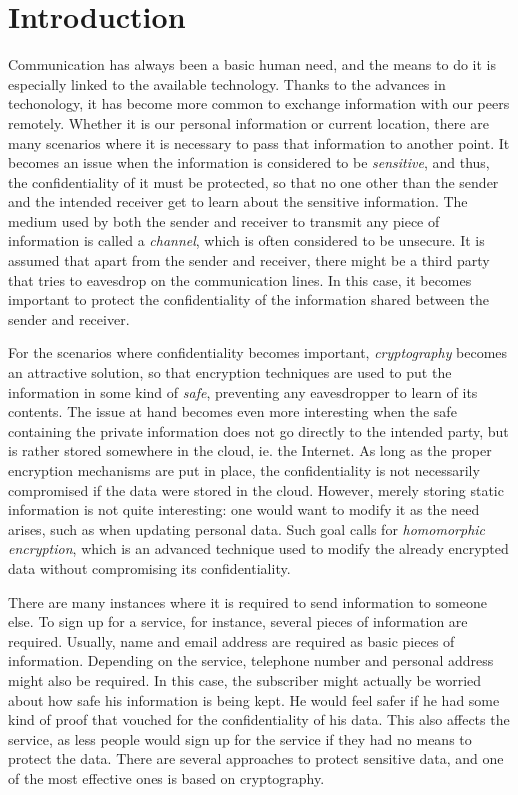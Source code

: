 \chapter{Introduction}
\label{intro}

Communication has always been a basic human need, and the means to do it is especially linked to the available technology. Thanks to the advances in techonology, it has become more common to exchange information with our peers remotely. Whether it is our personal information or current location, there are many scenarios where it is necessary to pass that information to another point. It becomes an issue when the information is considered to be \emph{sensitive}, and thus, the confidentiality of it must be protected, so that no one other than the sender and the intended receiver get to learn about the sensitive information. The medium used by both the sender and receiver to transmit any piece of information is called a \emph{channel}, which is often considered to be unsecure. It is assumed that apart from the sender and receiver, there might be a third party that tries to eavesdrop on the communication lines. In this case, it becomes important to protect the confidentiality of the information shared between the sender and receiver. 

For the scenarios where confidentiality becomes important, \emph{cryptography} becomes an attractive solution, so that encryption techniques are used to put the information in some kind of \emph{safe}, preventing any eavesdropper to learn of its contents. The issue at hand becomes even more interesting when the safe containing the private information does not go directly to the intended party, but is rather stored somewhere in the cloud, ie. the Internet. As long as the proper encryption mechanisms are put in place, the confidentiality is not necessarily compromised if the data were stored in the cloud. However, merely storing static information is not quite interesting: one would want to modify it as the need arises, such as when updating personal data. Such goal calls for \emph{homomorphic encryption}, which is an advanced technique used to modify the already encrypted data without compromising its confidentiality.

There are many instances where it is required to send information to someone else. To sign up for a service, for instance, several pieces of information are required. Usually, name and email address are required as basic pieces of information. Depending on the service, telephone number and personal address might also be required. In this case, the subscriber might actually be worried about how safe his information is being kept. He would feel safer if he had some kind of proof that vouched for the confidentiality of his data. This also affects the service, as less people would sign up for the service if they had no means to protect the data. There are several approaches to protect sensitive data, and one of the most effective ones is based on cryptography.

